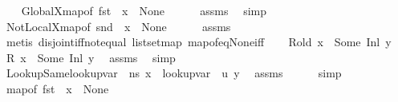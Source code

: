 \begin{isabellebody}
\ \ \isamarkupfalse%
\ GlobalX{\isacharcolon}{\kern0pt}{\isachardoublequoteopen}map{\isacharunderscore}{\kern0pt}of\ {\isacharparenleft}{\kern0pt}fst\ {\isasymLambda}{}{\isacharparenright}{\kern0pt}\ x\ {\isasymnoteq}\ None{\isachardoublequoteclose}\isanewline
\ \ \ \ \isamarkupfalse%
\ assms{\isacharparenleft}{\kern0pt}{}{\isacharparenright}{\kern0pt}\ \isamarkupfalse%
\ simp\isanewline
\ \ \isamarkupfalse%
\ NotLocalX{\isacharcolon}{\kern0pt}{\isachardoublequoteopen}map{\isacharunderscore}{\kern0pt}of\ {\isacharparenleft}{\kern0pt}snd\ {\isasymLambda}{}{\isacharparenright}{\kern0pt}\ x\ {\isacharequal}{\kern0pt}\ None{\isachardoublequoteclose}\isanewline
\ \ \ \ \isamarkupfalse%
\ assms{\isacharparenleft}{\kern0pt}{}{\isacharparenright}{\kern0pt}\isanewline
\ \ \ \ \isamarkupfalse%
\ {\isacharparenleft}{\kern0pt}metis\ disjoint{\isacharunderscore}{\kern0pt}iff{\isacharunderscore}{\kern0pt}not{\isacharunderscore}{\kern0pt}equal\ list{\isachardot}{\kern0pt}set{\isacharunderscore}{\kern0pt}map\ map{\isacharunderscore}{\kern0pt}of{\isacharunderscore}{\kern0pt}eq{\isacharunderscore}{\kern0pt}None{\isacharunderscore}{\kern0pt}iff{\isacharparenright}{\kern0pt}\isanewline
\isanewline
\ \ \isamarkupfalse%
\ {\isacartoucheopen}R{\isacharunderscore}{\kern0pt}old\ x\ {\isacharequal}{\kern0pt}\ Some\ {\isacharparenleft}{\kern0pt}Inl\ y{\isacharparenright}{\kern0pt}{\isacartoucheclose}\ \isamarkupfalse%
\ {\isachardoublequoteopen}R\ x\ {\isacharequal}{\kern0pt}\ Some\ {\isacharparenleft}{\kern0pt}Inl\ y{\isacharparenright}{\kern0pt}{\isachardoublequoteclose}\ \isamarkupfalse%
\ assms{\isacharparenleft}{\kern0pt}{}{\isacharparenright}{\kern0pt}\ \isamarkupfalse%
\ simp\ \ \isanewline
\ \ \isamarkupfalse%
\ LookupSame{\isacharcolon}{\kern0pt}{\isachardoublequoteopen}lookup{\isacharunderscore}{\kern0pt}var\ {\isasymLambda}{}\ ns\ x\ {\isacharequal}{\kern0pt}\ lookup{\isacharunderscore}{\kern0pt}var\ {\isasymLambda}{}\ u\ y{\isachardoublequoteclose}\ \isamarkupfalse%
\ assms{\isacharparenleft}{\kern0pt}{}{\isacharparenright}{\kern0pt}\isanewline
\ \ \ \ \isamarkupfalse%
\ simp\isanewline
\isanewline
\ \ \isamarkupfalse%
\ {\isacartoucheopen}map{\isacharunderscore}{\kern0pt}of\ {\isacharparenleft}{\kern0pt}fst\ {\isasymLambda}{}{\isacharparenright}{\kern0pt}\ x\ {\isasymnoteq}\ None{\isacartoucheclose}\isanewline

\end{isabellebody}

